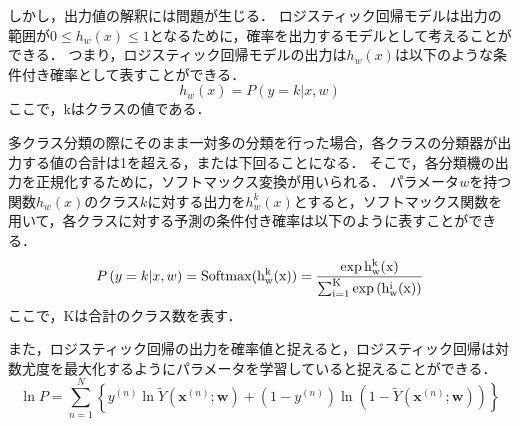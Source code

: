     しかし，出力値の解釈には問題が生じる．
    ロジスティック回帰モデルは出力の範囲が$0\leq h_w(x) \leq 1$となるために，確率を出力するモデルとして考えることができる．
    つまり，ロジスティック回帰モデルの出力は$h_w(x)$は以下のような条件付き確率として表すことができる．
    \begin{equation}
        h_w(x)=P\left( y=k|x,w \right)
    \end{equation}
    ここで，kはクラスの値である．
    
    多クラス分類の際にそのまま一対多の分類を行った場合，各クラスの分類器が出力する値の合計は1を超える，または下回ることになる．
    そこで，各分類機の出力を正規化するために，ソフトマックス変換が用いられる．
    パラメータ$w$を持つ関数$h_w(x)$のクラス$k$に対する出力を$h^k_w(x)$とすると，ソフトマックス関数を用いて，各クラスに対する予測の条件付き確率は以下のように表すことができる．
    \begin{equation}
        P\left( y=k|x,w \right) = \rm{Softmax}(h^k_w(x)) = \frac{\exp{h^k_w(x)}}{\sum^K_{i=1}\exp{\left(h^i_w(x)\right)}}
    \end{equation}
    ここで，Kは合計のクラス数を表す．
    
    また，ロジスティック回帰の出力を確率値と捉えると，ロジスティック回帰は対数尤度を最大化するようにパラメータを学習していると捉えることができる．
    \begin{equation}
        \ln P=\sum_{n=1}^{N}\left\{y^{(n)} \ln \tilde{Y}\left(\mathbf{x}^{(n)} ; \mathbf{w}\right)+\left(1-y^{(n)}\right) \ln \left(1-\tilde{Y}\left(\mathbf{x}^{(n)} ; \mathbf{w}\right)\right)\right\}
    \end{equation}



